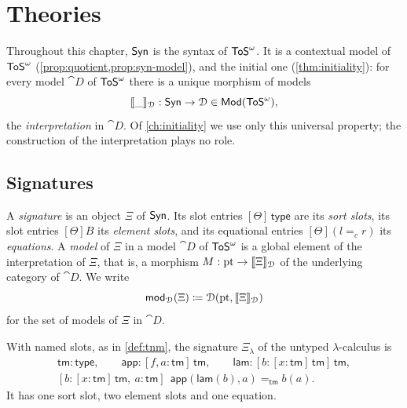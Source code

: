 \chapter{Theories}
\label{ch:theories}
\providecommand{\Mod}{\mathsf{Mod}}
\providecommand{\modset}{\mathsf{mod}}
\providecommand{\PiT}{\mathsf{\Pi}}
\providecommand{\lam}{\mathsf{lam}}
\providecommand{\app}{\mathsf{app}}
\providecommand{\Univ}{\mathsf{U}}
\providecommand{\El}{\mathsf{El}}
\providecommand{\Id}{\mathsf{Id}}
\providecommand{\refl}{\mathsf{refl}}
\providecommand{\bP}{\mathbf{P}}
\providecommand{\bS}{\mathbf{S}}
\providecommand{\bang}{{!}}
\providecommand{\ev}{\mathsf{ev}}
\providecommand{\dslash}{\mathord{/\mkern-5mu/}}
\providecommand{\Pos}{\mathsf{Pos}}
\providecommand{\PC}{\mathcal{P}\mkern-1mu\mathit{os}}

Throughout this chapter, $\mathsf{Syn}$ is the syntax of $\mathsf{ToS}^\omega$. It is a contextual model of $\mathsf{ToS}^\omega$ (\cref{prop:quotient,prop:syn-model}), and the initial one (\cref{thm:initiality}): for every model $\cat{D}$ of $\mathsf{ToS}^\omega$ there is a unique morphism of models
\[
    \sem{\_}_{\cat{D}} : \Syn \to \cat{D} \in \Mod(\ToS^{\omega}),
\]
the \emph{interpretation} in $\cat{D}$. Of \cref{ch:initiality} we use only this universal property; the construction of the interpretation plays no role.

\section{Signatures}
\label{sec:signatures}

\begin{definition}\label{def:signature}
    A \emph{signature} is an object $\Xi$ of $\mathsf{Syn}$. Its slot entries $[\Theta]\,\mathsf{type}$ are its \emph{sort slots}, its slot entries $[\Theta]B$ its \emph{element slots}, and its equational entries $[\Theta](l =_c r)$ its \emph{equations}. A \emph{model} of $\Xi$ in a model $\cat{D}$ of $\mathsf{ToS}^\omega$ is a global element of the interpretation of $\Xi$, that is, a morphism $M : \mathrm{pt} \to \llbracket\Xi\rrbracket_{\mathcal{D}}$ of the underlying category of $\cat{D}$. We write
    \[
        \modset_{\cat{D}}(\Xi) \coloneqq \cat{D}(\pt, \sem{\Xi}_{\cat{D}})
    \]
    for the set of models of $\Xi$ in $\cat{D}$.
\end{definition}

\begin{example}\label{ex:lambda}
    With named slots, as in \cref{def:tnm}, the signature $\Xi_\lambda$ of the untyped $\lambda$-calculus is
    \begin{gather*}
        \mathsf{tm} : \mathsf{type}, \qquad \mathsf{app} : [f, a : \mathsf{tm}]\,\mathsf{tm}, \qquad \mathsf{lam} : [b : [x : \mathsf{tm}]\,\mathsf{tm}]\,\mathsf{tm},\\
        [b : [x : \mathsf{tm}]\,\mathsf{tm},\ a : \mathsf{tm}]\ \ \mathsf{app}(\mathsf{lam}(b), a) =_{\mathsf{tm}} b(a).
    \end{gather*}
    It has one sort slot, two element slots and one equation.
\end{example}

